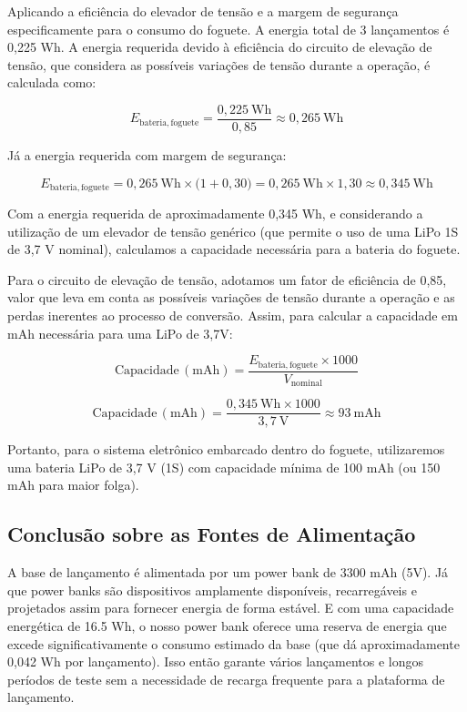 Aplicando a eficiência do elevador de tensão e a margem de segurança especificamente para o consumo do foguete. A energia total de 3 lançamentos é 0,225 Wh. A energia requerida devido à eficiência do circuito de elevação de tensão, que considera as possíveis variações de tensão durante a operação, é calculada como:

\begin{equation}
E_{\mathrm{bateria,foguete}}
=
\frac{0{,}225~\mathrm{Wh}}{0{,}85}
\approx
0{,}265~\mathrm{Wh}
\end{equation}

Já a energia requerida com margem de segurança:

\begin{equation}
E_{\mathrm{bateria,foguete}}
=
0{,}265~\mathrm{Wh}
\times
\bigl(1 + 0{,}30\bigr)
=
0{,}265~\mathrm{Wh}
\times
1{,}30
\approx
0{,}345~\mathrm{Wh}
\end{equation}

Com a energia requerida de aproximadamente 0,345 Wh, e considerando a utilização de um elevador de tensão genérico (que permite o uso de uma LiPo 1S de 3,7 V nominal), calculamos a capacidade necessária para a bateria do foguete.

Para o circuito de elevação de tensão, adotamos um fator de eficiência de 0,85, valor que leva em conta as possíveis variações de tensão durante a operação e as perdas inerentes ao processo de conversão. Assim, para calcular a capacidade em mAh necessária para uma LiPo de 3,7V:

\begin{equation}
\mathrm{Capacidade\,(mAh)}
=
\frac{E_{\mathrm{bateria,foguete}} \times 1000}{V_{\mathrm{nominal}}}
\end{equation}

\begin{equation}
\mathrm{Capacidade\,(mAh)}
=
\frac{0{,}345~\mathrm{Wh} \times 1000}{3{,}7~\mathrm{V}}
\approx
93~\mathrm{mAh}
\end{equation}

Portanto, para o sistema eletrônico embarcado dentro do foguete, utilizaremos uma bateria LiPo de 3,7 V (1S) com capacidade mínima de 100 mAh (ou 150 mAh para maior folga).

\subsection{Conclusão sobre as Fontes de Alimentação}

A base de lançamento é alimentada por um power bank de 3300 mAh (5V). Já que power banks são dispositivos amplamente disponíveis, recarregáveis e projetados assim para fornecer energia de forma estável. E com uma capacidade energética de 16.5 Wh, o nosso power bank oferece uma reserva de energia que excede significativamente o consumo estimado da base (que dá aproximadamente 0,042 Wh por lançamento). Isso então garante vários lançamentos e longos períodos de teste sem a necessidade de recarga frequente para a plataforma de lançamento. 


